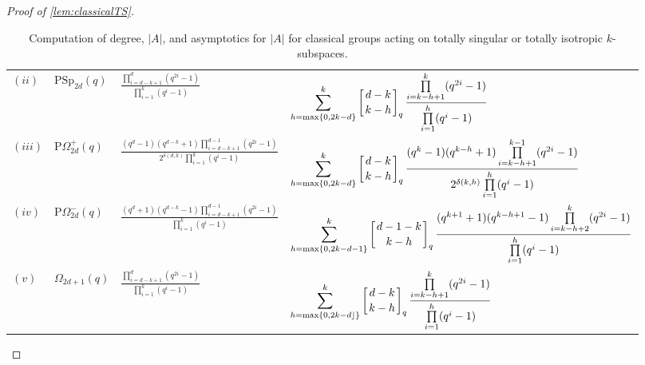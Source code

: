 \documentclass[a4paper]{amsart}
\theoremstyle{definition}
\begin{document}
\begin{proof}[Proof of \cref{lem:classicalTS}]
{\begin{table}
\begin{tabularx}{\textwidth}{l l X X}
        $(ii)$ & $\mathrm{PSp}_{2d}(q)$ & $\displaystyle \frac{\prod\limits_{i = d-k+1}^{d}(q^{2i} - 1)}{\prod\limits_{i = 1}^k (q^{i}-1)}$& 
        $\displaystyle \sum\limits_{h=\max\{0, 2k - d\}}^{k} \left[ d - k \atop k-h \right]_q 
        \frac{\prod\limits_{i =k - h +1}^{k}(q^{2i} - 1)}{\prod\limits_{i = 1}^h (q^{i}-1)}$%
        
        \\
        
        $(iii)$ & $\mathrm{P}\Omega_{2d}^+(q)$ & $\displaystyle \frac{(q^d-1)(q^{d-k}+1)\prod\limits_{i = d-k+1}^{d-1}(q^{2i}-1)}{2^{\delta (d,k)}\prod\limits_{i = 1}^k (q^{i}-1)}$ & $\displaystyle \sum\limits_{h=\max\{0, 2k - d\}}^{k} \left[ d - k \atop k-h \right]_q
        \frac{(q^k-1)(q^{k-h}+1)\prod\limits_{i = k-h+1}^{k-1}(q^{2i}-1)}{2^{\delta (k,h)}\prod\limits_{i = 1}^h (q^{i}-1)}$
        \\
        
        $(iv)$ & $\mathrm{P}\Omega_{2d}^-(q)$ &  $\displaystyle \frac{(q^d+1)(q^{d-k}-1)\prod\limits_{i = d-k+1}^{d-1}(q^{2i}-1)}{\prod\limits_{i = 1}^k (q^{i}-1)}$ & $\displaystyle \sum\limits_{h=\max\{0, 2k - d -1\}}^{k} \left[ d -1 - k \atop k-h \right]_q
        \frac{(q^{k+1}+1)(q^{k-h+1}-1)\prod\limits_{i = k-h+2}^{k}(q^{2i}-1)}{\prod\limits_{i = 1}^h (q^{i}-1)}$
        \\
        
        $(v)$ & $\Omega_{2d+1}(q)$ & $\displaystyle \frac{\prod\limits_{i = d-k+1}^{d}(q^{2i}-1)}{\prod\limits_{i = 1}^k (q^{i}-1)}$ & $\displaystyle \sum\limits_{h=\max\{0, 2k - d \rfloor\}}^{k} \left[ d - k \atop k-h \right]_q
        \frac{\prod\limits_{i = k-h+1}^{k}(q^{2i}-1)}{\prod\limits_{i = 1}^h (q^{i}-1)}$ %
        \\
        \bottomrule
	\end{tabularx}%
	{\medskip \caption{Computation of degree, $|A|$, and asymptotics for $|A|$ for classical groups acting on totally singular or totally isotropic $k$-subspaces.}%
	\label{table:TS}}%
\end{table}%
}
\end{proof}
\end{document}
